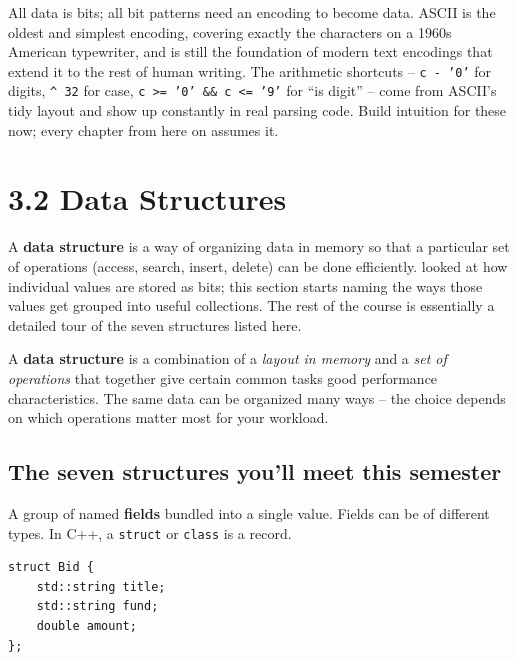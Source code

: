 \documentclass[11pt]{article}
\begin{document}
\begin{ideabox}
All data is bits; all bit patterns need an encoding to become data.
ASCII is the oldest and simplest encoding, covering exactly the
characters on a 1960s American typewriter, and is still the
foundation of modern text encodings that extend it to the rest of
human writing. The arithmetic shortcuts -- \texttt{c - '0'} for
digits, \texttt{\textasciicircum\ 32} for case, \texttt{c >= '0' \&\&
c <= '9'} for ``is digit'' -- come from ASCII's tidy layout and show
up constantly in real parsing code. Build intuition for these now;
every chapter from here on assumes it.
\end{ideabox}

\section{3.2 Data Structures}

A \textbf{data structure} is a way of organizing data in memory so
that a particular set of operations (access, search, insert, delete)
can be done efficiently.  looked at how individual
values are stored as bits; this section starts naming the ways those
values get grouped into useful collections. The rest of the course is
essentially a detailed tour of the seven structures listed here.

\begin{defnbox}
A \textbf{data structure} is a combination of a \emph{layout in
memory} and a \emph{set of operations} that together give certain
common tasks good performance characteristics. The same data can be
organized many ways -- the choice depends on which operations matter
most for your workload.
\end{defnbox}

\subsection{The seven structures you'll meet this semester}

\begin{defnbox}
A group of named \textbf{fields} bundled into a single value. Fields
can be of different types. In C++, a \texttt{struct} or \texttt{class}
is a record.
\begin{verbatim}
struct Bid {
    std::string title;
    std::string fund;
    double amount;
};
\end{verbatim}
\end{defnbox}
\end{document}
